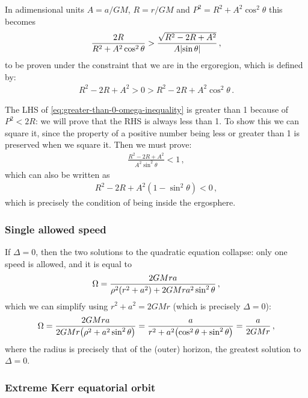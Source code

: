 \documentclass[main.tex]{subfiles}
\begin{document}
In adimensional units \(A = a/GM\), \(R = r / GM\) and \(P^2 = R^2+A^2 \cos^2\theta \) this becomes 
%
\begin{align} \label{eq:greater-than-0-omega-inequality}
\frac{2R}{R^2+A^2 \cos^2\theta } > \frac{\sqrt{R^2-2R+A^2}}{A\abs{\sin \theta }}
\,,
\end{align}
%
to be proven under the constraint that we are in the ergoregion, which is defined by: 
%
\begin{align}
R^2- 2R + A^2 > 0 > R^2 - 2R + A^2 \cos^2\theta 
\,.
\end{align}

The LHS of \eqref{eq:greater-than-0-omega-inequality} is greater than 1 because of \(P^2<2R\): we will prove that the RHS is always less than 1. To show this we can square it, since the property of a positive  number being less or greater than 1 is preserved when we square it. Then we must prove: 
%
\begin{align}
\frac{R^2 - 2R + A^2}{A^2 \sin^2\theta } < 1 
\,,
\end{align}
%
which can also be written as 
%
\begin{align}
R^2 - 2R + A^2 (1 - \sin^2 \theta ) < 0
\,,
\end{align}
%
which is precisely the condition of being inside the ergosphere. 

\subsubsection{Single allowed speed}

If \(\Delta = 0\), then the two solutions to the quadratic equation collapse: only one speed is allowed, and it is equal to 
%
\begin{align}
\Omega = \frac{2GMra}{\rho^2 \qty(r^2+a^2) + 2GMr a^2 \sin^2\theta }
\,,
\end{align}
%
which we can simplify using \(r^2+a^2 = 2GMr\) (which is  precisely \(\Delta = 0\)): 
%
\begin{align}
\Omega = \frac{2GMra}{2GMr \qty( \rho^2 + a^2 \sin^2 \theta )} = \frac{a}{r^2 + a^2 \qty(\cos^2\theta +\sin^2\theta )} = \frac{a}{2GMr}
\,,
\end{align}
%
where the radius is precisely that of the (outer) horizon, the greatest solution  to \(\Delta = 0\). 

\subsubsection{Extreme Kerr equatorial orbit}
\end{document}
